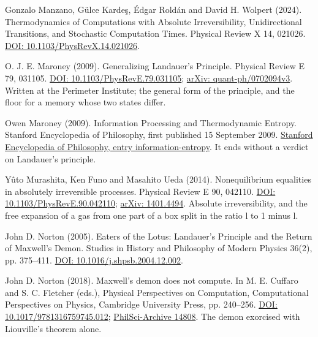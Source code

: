 \documentclass[11pt,twoside]{article}
\theoremstyle{thielethm}
\theoremstyle{thieledef}
\theoremstyle{thieledef}
\theoremstyle{thieledef}
\theoremstyle{thielethm}
\theoremstyle{thieleobs}
\theoremstyle{thielethm}
\begin{document}
\noindent Gonzalo Manzano, G\"ulce Karde\c{s}, \'Edgar Rold\'an and David H. Wolpert (2024). Thermodynamics of Computations with Absolute Irreversibility, Unidirectional Transitions, and Stochastic Computation Times. Physical Review X 14, 021026. \href{https://doi.org/10.1103/PhysRevX.14.021026}{DOI: 10.1103/PhysRevX.14.021026}.
\par\medskip

\noindent O. J. E. Maroney (2009). Generalizing Landauer's Principle. Physical Review E 79, 031105. \href{https://doi.org/10.1103/PhysRevE.79.031105}{DOI: 10.1103/PhysRevE.79.031105}; \href{https://arxiv.org/abs/quant-ph/0702094v3}{arXiv: quant-ph/0702094v3}. Written at the Perimeter Institute; the general form of the principle, and the floor for a memory whose two states differ.
\par\medskip

\noindent Owen Maroney (2009). Information Processing and Thermodynamic Entropy. Stanford Encyclopedia of Philosophy, first published 15 September 2009. \href{https://plato.stanford.edu/entries/information-entropy/}{Stanford Encyclopedia of Philosophy, entry information-entropy}. It ends without a verdict on Landauer's principle.
\par\medskip

\noindent Y\^uto Murashita, Ken Funo and Masahito Ueda (2014). Nonequilibrium equalities in absolutely irreversible processes. Physical Review E 90, 042110. \href{https://doi.org/10.1103/PhysRevE.90.042110}{DOI: 10.1103/PhysRevE.90.042110}; \href{https://arxiv.org/abs/1401.4494}{arXiv: 1401.4494}. Absolute irreversibility, and the free expansion of a gas from one part of a box split in the ratio l to 1 minus l.
\par\medskip

\noindent John D. Norton (2005). Eaters of the Lotus: Landauer's Principle and the Return of Maxwell's Demon. Studies in History and Philosophy of Modern Physics 36(2), pp. 375--411. \href{https://doi.org/10.1016/j.shpsb.2004.12.002}{DOI: 10.1016/j.shpsb.2004.12.002}.
\par\medskip

\noindent John D. Norton (2018). Maxwell's demon does not compute. In M. E. Cuffaro and S. C. Fletcher (eds.), Physical Perspectives on Computation, Computational Perspectives on Physics, Cambridge University Press, pp. 240--256. \href{https://doi.org/10.1017/9781316759745.012}{DOI: 10.1017/9781316759745.012}; \href{https://philsci-archive.pitt.edu/14808/}{PhilSci-Archive 14808}. The demon exorcised with Liouville's theorem alone.
\par\medskip
\end{document}
